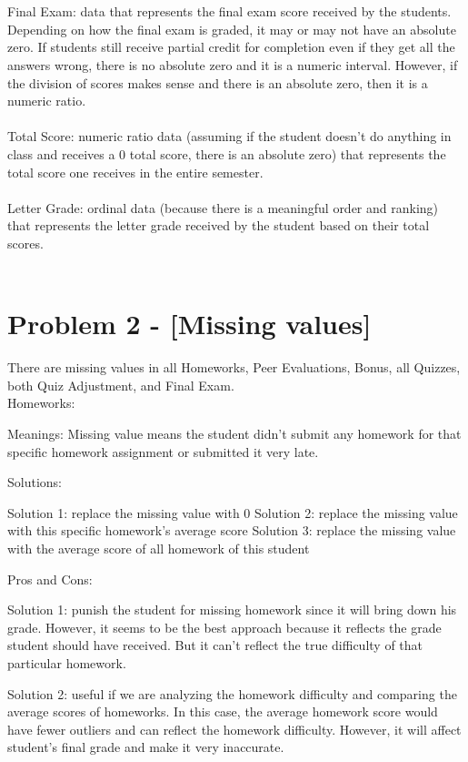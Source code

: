 \documentclass[9pt,twoside]{exam}
\begin{document}
\\\\
Final Exam:  data that represents the final exam score received by the students. Depending on how the final exam is graded, it may or may not have an absolute zero. If students still receive partial credit for completion even if they get all the answers wrong, there is no absolute zero and it is a numeric interval. However, if the division of scores makes sense and there is an absolute zero, then it is a numeric ratio. 
\\\\
Total Score: numeric ratio data (assuming if the student doesn't do anything in class and receives a 0 total score, there is an absolute zero) that represents the total score one receives in the entire semester. 
\\\\
Letter Grade: ordinal data (because there is a meaningful order and ranking) that represents the letter grade received by the student based on their total scores.
\\\\

\section*{Problem 2 -  [Missing values]}

There are missing values in all Homeworks, Peer Evaluations, Bonus, all Quizzes, both Quiz Adjustment, and Final Exam.\\

Homeworks:

Meanings: 
Missing value means the student didn't submit any homework for that specific homework assignment or submitted it very late.


Solutions:

Solution 1: replace the missing value with 0
Solution 2: replace the missing value with this specific homework's average score
Solution 3: replace the missing value with the average score of all homework of this student 


Pros and Cons:

Solution 1: punish the student for missing homework since it will bring down his grade. However, it seems to be the best approach because it reflects the grade student should have received. But it can't reflect the true difficulty of that particular homework.


Solution 2: useful if we are analyzing the homework difficulty and comparing the average scores of homeworks. In this case, the average homework score would have fewer outliers and can reflect the homework difficulty. However, it will affect student's final grade and make it very inaccurate.
\end{document}
